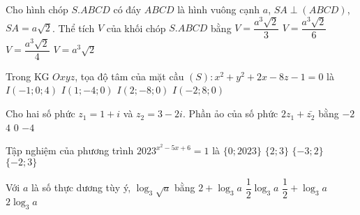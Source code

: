 \begin{ex}%
	Cho hình chóp $S.ABCD$ có đáy $ABCD$ là hình vuông cạnh $a$, $SA\perp (ABCD)$, $SA=a\sqrt{2}$. Thể tích $V$ của khối chóp $S.ABCD$ bằng
	\choice
	{\True $V=\dfrac{a^3\sqrt{2}}{3}$}
	{$V=\dfrac{a^3\sqrt{2}}{6}$}
	{$V=\dfrac{a^3\sqrt{2}}{4}$}
	{$V=a^3\sqrt{2}$}
\end{ex}
\begin{ex}%
	Trong KG $Oxyz$, tọa độ tâm của mặt cầu $(S)\colon x^2+y^2+2x-8z-1=0$ là
	\choice
	{\True $I(-1;0;4)$}
	{$I(1;-4;0)$}
	{$I(2;-8;0)$}
	{$I(-2;8;0)$}
\end{ex}
\begin{ex}%
	Cho hai số phức $z_1=1+i$ và $z_2=3-2i$. Phần ảo của số phức $2z_1+\bar{z_2}$ bằng
	\choice
	{$-2$}
	{\True $4$}
	{$0$}
	{$-4$}
\end{ex}
\begin{ex}%
	Tập nghiệm của phương trình $2023^{x^2-5x+6}=1$ là
	\choice
	{$\{0;2023\}$}
	{\True $\{2;3\}$}
	{$\{-3;2\}$}
	{$\{-2;3\}$}
\end{ex}
\begin{ex}%
	Với $a$ là số thực dương tùy ý, $\log_3\sqrt{a}$ bằng
	\choice
	{$2+\log_3a$}
	{\True $\dfrac{1}{2}\log_3a$}
	{$\dfrac{1}{2}+\log_3a$}
	{$2\log_3a$}
\end{ex}

